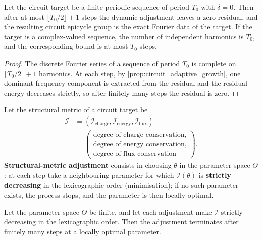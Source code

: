 \begin{theorem}\label{thm:circuit_adaptive_convergence}
Let the circuit target be a finite periodic sequence of period $T_0$ with $\delta=0$. Then after at most $\lfloor T_0/2\rfloor+1$ steps the dynamic adjustment leaves a zero residual, and the resulting circuit epicycle group is the exact Fourier data of the target. If the target is a complex-valued sequence, the number of independent harmonics is $T_0$, and the corresponding bound is at most $T_0$ steps.
\end{theorem}

\begin{proof}
The discrete Fourier series of a sequence of period $T_0$ is complete on $\lfloor T_0/2\rfloor+1$ harmonics. At each step, by \cref{prop:circuit_adaptive_growth}, one dominant-frequency component is extracted from the residual and the residual energy decreases strictly, so after finitely many steps the residual is zero.
\end{proof}

\begin{definition}\label{def:circuit_structure_metric_adjustment}
Let the structural metric of a circuit target be
\[
\begin{aligned}
\mathcal I
&=(\mathcal I_{\text{charge}},\mathcal I_{\text{energy}},\mathcal I_{\text{flux}})\\
&=\left(\begin{array}{l}
\text{degree of charge conservation},\\
\text{degree of energy conservation},\\
\text{degree of flux conservation}
\end{array}\right).
\end{aligned}
\]
\textbf{Structural-metric adjustment} consists in choosing $\theta$ in the parameter space $\Theta$: at each step take a neighbouring parameter for which $\mathcal I(\theta)$ is \textbf{strictly decreasing} in the lexicographic order (minimisation); if no such parameter exists, the process stops, and the parameter is then locally optimal.
\end{definition}

\begin{proposition}\label{prop:circuit_structure_metric_convergence}
Let the parameter space $\Theta$ be finite, and let each adjustment make $\mathcal I$ strictly decreasing in the lexicographic order. Then the adjustment terminates after finitely many steps at a locally optimal parameter.
\end{proposition}

